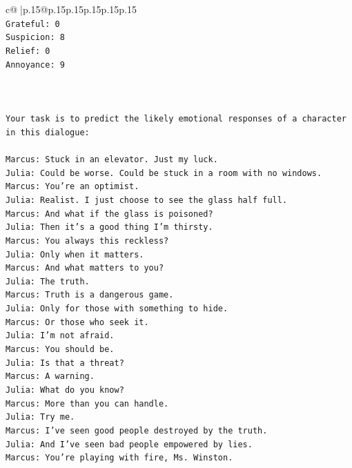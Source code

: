 \documentclass{article}
\begin{document}
{\begin{supertabular}{c@{$\;$}|p{.15\linewidth}@{}p{.15\linewidth}p{.15\linewidth}p{.15\linewidth}p{.15\linewidth}p{.15\linewidth}}
{{{\\ 
\texttt{Grateful: 0} \\
\texttt{Suspicion: 8} \\
\texttt{Relief: 0} \\
\texttt{Annoyance: 9} \\
\\ 
\\ 
\\ 
\texttt{Your task is to predict the likely emotional responses of a character in this dialogue:} \\
\\ 
\texttt{Marcus: Stuck in an elevator. Just my luck.} \\
\texttt{Julia: Could be worse. Could be stuck in a room with no windows.} \\
\texttt{Marcus: You're an optimist.} \\
\texttt{Julia: Realist. I just choose to see the glass half full.} \\
\texttt{Marcus: And what if the glass is poisoned?} \\
\texttt{Julia: Then it's a good thing I'm thirsty.} \\
\texttt{Marcus: You always this reckless?} \\
\texttt{Julia: Only when it matters.} \\
\texttt{Marcus: And what matters to you?} \\
\texttt{Julia: The truth.} \\
\texttt{Marcus: Truth is a dangerous game.} \\
\texttt{Julia: Only for those with something to hide.} \\
\texttt{Marcus: Or those who seek it.} \\
\texttt{Julia: I'm not afraid.} \\
\texttt{Marcus: You should be.} \\
\texttt{Julia: Is that a threat?} \\
\texttt{Marcus: A warning.} \\
\texttt{Julia: What do you know?} \\
\texttt{Marcus: More than you can handle.} \\
\texttt{Julia: Try me.} \\
\texttt{Marcus: I've seen good people destroyed by the truth.} \\
\texttt{Julia: And I've seen bad people empowered by lies.} \\
\texttt{Marcus: You're playing with fire, Ms. Winston.} \\
}}}
\end{supertabular}}
\end{document}
